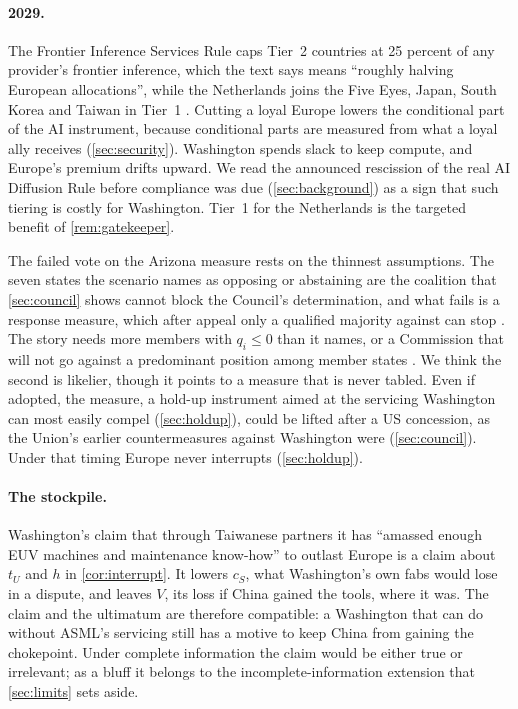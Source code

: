\paragraph{2029.} The Frontier Inference Services Rule caps Tier~2 countries at 25 percent of any provider's frontier inference, which the text says means ``roughly halving European allocations'', while the Netherlands joins the Five Eyes, Japan, South Korea and Taiwan in Tier~1 \citep{juijn2026europe}. Cutting a loyal Europe lowers the conditional part of the AI instrument, because conditional parts are measured from what a loyal ally receives (\cref{sec:security}). Washington spends slack to keep compute, and Europe's premium drifts upward. We read the announced rescission of the real AI Diffusion Rule before compliance was due (\cref{sec:background}) as a sign that such tiering is costly for Washington. Tier~1 for the Netherlands is the targeted benefit of \cref{rem:gatekeeper}.

The failed vote on the Arizona measure rests on the thinnest assumptions. The seven states the scenario names as opposing or abstaining are the coalition that \cref{sec:council} shows cannot block the Council's determination, and what fails is a response measure, which after appeal only a qualified majority against can stop \citep{eu2023aci, eu2011comitology}. The story needs more members with $q_i\le 0$ than it names, or a Commission that will not go against a predominant position among member states \citep{commission2023acistatement}. We think the second is likelier, though it points to a measure that is never tabled. Even if adopted, the measure, a hold-up instrument aimed at the servicing Washington can most easily compel (\cref{sec:holdup}), could be lifted after a US concession, as the Union's earlier countermeasures against Washington were (\cref{sec:council}). Under that timing Europe never interrupts (\cref{sec:holdup}).

\paragraph{The stockpile.} Washington's claim that through Taiwanese partners it has ``amassed enough EUV machines and maintenance know-how'' to outlast Europe \citep{juijn2026europe} is a claim about $t_U$ and $h$ in \cref{cor:interrupt}. It lowers $c_S$, what Washington's own fabs would lose in a dispute, and leaves $V$, its loss if China gained the tools, where it was. The claim and the ultimatum are therefore compatible: a Washington that can do without ASML's servicing still has a motive to keep China from gaining the chokepoint. Under complete information the claim would be either true or irrelevant; as a bluff it belongs to the incomplete-information extension that \cref{sec:limits} sets aside.

